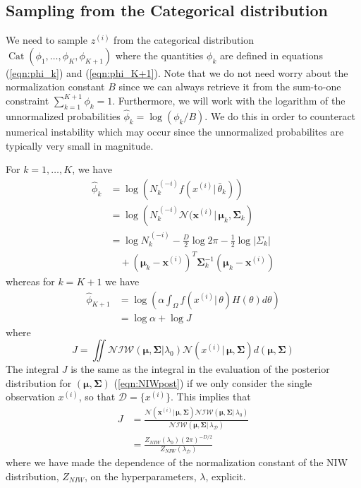 \documentclass[final,3p,times,twocolumn]{elsarticle}
\DeclareMathOperator*{\Cat}{Cat}
\let\bs\boldsymbol
\begin{document}
\subsection{Sampling from the Categorical distribution}
We need to sample $z^{(i)}$ from the categorical distribution $\Cat(\phi_1,\dots,\phi_K,\phi_{K+1})$ where the quantities $\phi_k$ are defined in equations (\ref{eqn:phi_k}) and (\ref{eqn:phi_K+1}).
Note that we do not need worry about the normalization constant $B$ since we can always retrieve it from the sum-to-one constraint $\sum_{k=1}^{K+1}\phi_k=1$.
Furthermore, we will work with the logarithm of the unnormalized probabilities $\hat\phi_k = \log(\phi_k/B)$.
We do this in order to counteract numerical instability which may occur since the unnormalized probabilites are typically very small in magnitude. 

For $k=1,\dots,K$, we have
\begin{equation*}
\begin{split}
\hat\phi_k &= \log\left(N^{\,(-i)}_k f(x^{(i)}|\,\bar\theta_k)\right)\\
&= \log\left(N^{\,(-i)}_k \mathcal{N}(\bs x^{(i)}|\,\bs\mu_k,\bs\Sigma_k\right)\\
&= \log N^{\,(-i)}_k -\frac{D}{2}\log2\pi -\frac{1}{2}\log|\Sigma_k|\\
&\quad+ (\bs\mu_k-\bs x^{(i)})^T\bs\Sigma_k^{-1}(\bs\mu_k-\bs x^{(i)})
\end{split}
\end{equation*}
whereas for $k=K+1$ we have
\begin{equation*}
\begin{split}
\hat\phi_{K+1} &= \log\left(\alpha\int_\Omega f(x^{(i)}|\,\theta)H(\theta)d\theta\right)\\
&=\log\alpha+\log J
\end{split}
\end{equation*}
where
\begin{equation*}
J = \iint\mathcal{NIW}(\bs\mu,\bs\Sigma|\lambda_0)\mathcal{N}(x^{(i)}|\,\bs\mu,\bs\Sigma)d(\bs\mu,\bs\Sigma)
\end{equation*}
The integral $J$ is the same as the integral in the evaluation of the posterior distribution for $(\bs\mu,\bs\Sigma)$ (\ref{eqn:NIWpost}) if we only consider the single observation $x^{(i)}$, so that $\mathcal{D}=\{x^{(i)}\}$.
This implies that
\begin{equation*}
\begin{split}
J &= \frac{\mathcal{N}(\bs x^{(i)}|\,\bs\mu,\bs\Sigma)\mathcal{NIW}(\bs\mu,\bs\Sigma|\,\lambda_0)}{\mathcal{NIW}(\bs\mu,\bs\Sigma|\,\lambda_\mathcal{D})}\\
&= \frac{Z_{NIW}(\lambda_0) (2\pi)^{-D/2}}{Z_{NIW}(\lambda_\mathcal{D})}
\end{split}
\end{equation*}
where we have made the dependence of the normalization constant of the NIW distribution, $Z_{NIW}$, on the hyperparameters, $\lambda$, explicit.
\end{document}
